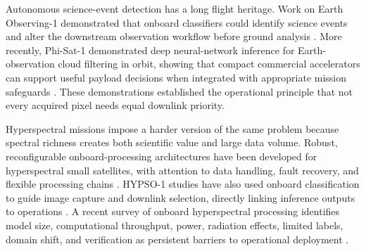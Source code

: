 \documentclass[a4paper,fleqn]{cas-dc}
\begin{document}


Autonomous science-event detection has a long flight heritage. Work on Earth Observing-1 demonstrated that onboard classifiers could identify science events and alter the downstream observation workflow before ground analysis \cite{castano2006onboard}. More recently, Phi-Sat-1 demonstrated deep neural-network inference for Earth-observation cloud filtering in orbit, showing that compact commercial accelerators can support useful payload decisions when integrated with appropriate mission safeguards \cite{giuffrida2022phisat1}. These demonstrations established the operational principle that not every acquired pixel needs equal downlink priority.

Hyperspectral missions impose a harder version of the same problem because spectral richness creates both scientific value and large data volume. Robust, reconfigurable onboard-processing architectures have been developed for hyperspectral small satellites, with attention to data handling, fault recovery, and flexible processing chains \cite{langer2023robust}. HYPSO-1 studies have also used onboard classification to guide image capture and downlink selection, directly linking inference outputs to operations \cite{berg2024onboard}. A recent survey of onboard hyperspectral processing identifies model size, computational throughput, power, radiation effects, limited labels, domain shift, and verification as persistent barriers to operational deployment \cite{ghasemi2025onboardreview}.
\end{document}
